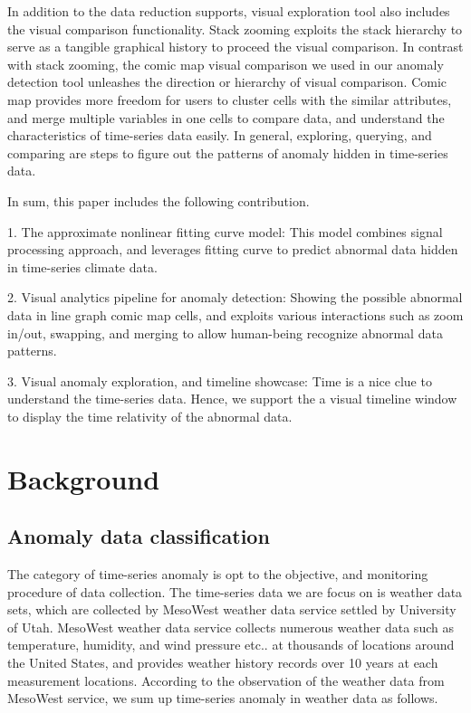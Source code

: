 \documentclass{vgtc}                          %
\begin{document}
In addition to the data reduction supports, visual exploration tool also includes the visual comparison functionality. Stack zooming \cite{javed2010stack} exploits the stack hierarchy to serve as a tangible graphical history to proceed the visual comparison. In contrast with stack zooming, the comic map visual comparison we used in our anomaly detection tool unleashes the direction or hierarchy of visual comparison. Comic map provides more freedom for users to cluster cells with the similar attributes, and merge multiple variables in one cells to compare data, and understand the characteristics of time-series data easily. In general, exploring, querying, and comparing are steps to figure out the patterns of anomaly hidden in time-series data.
		
In sum, this paper includes the following contribution. 

1. The approximate nonlinear fitting curve model: This model combines signal processing approach, and leverages fitting curve to predict abnormal data hidden in time-series climate data.  
 
2. Visual analytics pipeline for anomaly detection: Showing the possible abnormal data in line graph comic map cells, and exploits various interactions such as zoom in/out, swapping, and merging to allow human-being recognize abnormal data patterns.

3. Visual anomaly exploration, and timeline showcase: Time is a nice clue to understand the time-series data. Hence, we support the a visual timeline window to display the time relativity of the abnormal data.    

\section{Background}

\subsection{Anomaly data classification}

The category of time-series anomaly is opt to the objective, and monitoring procedure of data collection. The time-series data we are focus on is weather data sets, which are collected by MesoWest weather data service settled by University of Utah. MesoWest weather data service collects numerous weather data such as temperature, humidity, and wind pressure etc.. at thousands of locations around the United States, and provides weather history records over 10 years at each measurement locations. According to the observation of the weather data from MesoWest service, we sum up time-series anomaly in weather data as follows.
\end{document}

